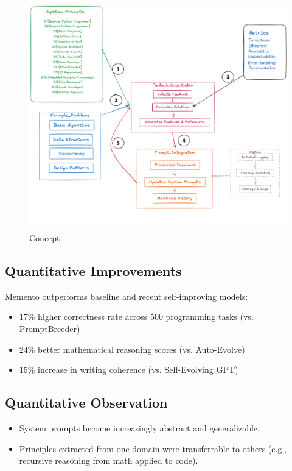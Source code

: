\documentclass[10pt,a4paper,twocolumn]{article}
\begin{document}
\begin{figure}
    \centering
    \includegraphics[width=1\linewidth]{concept.png}
    \caption{Concept}
    \label{concept}
\end{figure}



\subsection{Quantitative Improvements}


 Memento outperforms baseline and recent self-improving models:

\begin{itemize}
    \item 17\% higher correctness rate across 500 programming tasks (vs. PromptBreeder)
    \item 24\% better mathematical reasoning scores (vs. Auto-Evolve)
    \item 15\% increase in writing coherence (vs. Self-Evolving GPT)
\end{itemize}



\subsection{Quantitative Observation}


\begin{itemize}
    \item System prompts become increasingly abstract and generalizable.
    \item Principles extracted from one domain were transferrable to others (e.g., recursive reasoning from math applied to code).
\end{itemize}
\end{document}
